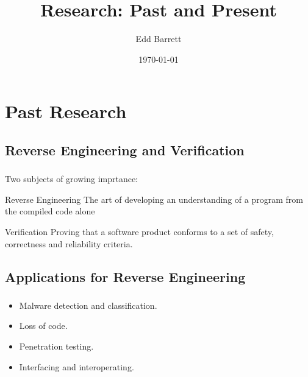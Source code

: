 \documentclass[compress]{beamer}
\title{Research: Past and Present}
\author{Edd Barrett}
\date{\today}
\institute{%
	Software Development Team\\
	King's College London, England
}
\begin{document}
\begin{frame}
  \titlepage
\end{frame}

\section{Past Research}

\begin{frame}
  \sectionpage
\end{frame}

\subsection{Reverse Engineering and Verification}

\begin{frame}[fragile]
	\frametitle{\insertsubsection}

	Two subjects of growing imprtance:
	\vfill
	\begin{block}{Reverse Engineering}
                The art of developing an understanding of a program from
                the compiled code alone
	\end{block}
	\vfill
	\begin{block}{Verification}
                Proving that a software product conforms to a set of
                safety, correctness and reliability criteria.
	\end{block}

\end{frame}


\subsection{Applications for Reverse Engineering}
\begin{frame}[fragile]
	\frametitle{\insertsubsection}

	\begin{itemize}
		\vfill
	\item Malware detection and classification.
		\vfill
	\item Loss of code.
		\vfill
	\item Penetration testing.
		\vfill
	\item Interfacing and interoperating.
		\vfill
	\end{itemize}

\end{frame}
\end{document}
